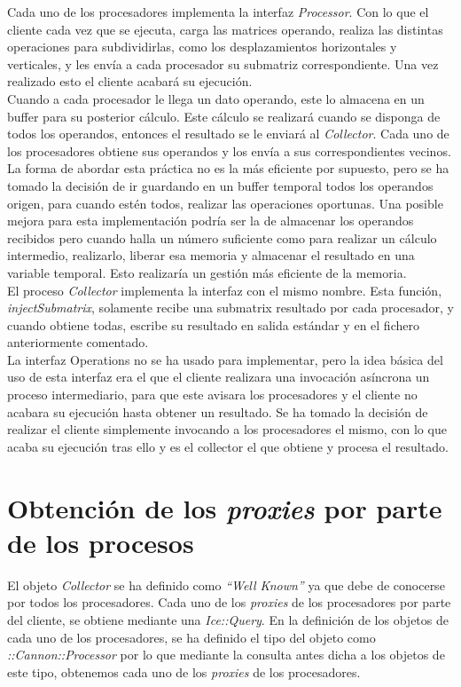 Cada uno de los procesadores implementa la interfaz \emph{ Processor}. Con lo que el cliente cada vez que se ejecuta, carga las matrices operando, realiza las distintas operaciones para subdividirlas, como los desplazamientos horizontales y verticales, y les envía a cada procesador su submatriz correspondiente. Una vez realizado esto el cliente acabará su ejecución. \\
Cuando a cada procesador le llega un dato operando, este lo almacena en un buffer para su posterior cálculo. Este cálculo se realizará cuando se disponga de todos los operandos, entonces el resultado se le enviará al \emph{Collector}. Cada uno de los procesadores obtiene sus operandos y los envía a sus correspondientes vecinos.\\ 
La forma de abordar esta práctica no es la más eficiente por supuesto, pero se ha tomado la decisión de ir guardando en un buffer temporal todos los operandos origen, para cuando estén todos, realizar las operaciones oportunas. Una posible mejora para esta implementación podría ser la de almacenar los operandos recibidos pero cuando halla un número suficiente como para realizar un cálculo intermedio, realizarlo, liberar esa memoria y almacenar el resultado en una variable temporal. Esto realizaría un gestión más eficiente de la memoria. 
\\
El proceso \emph{Collector} implementa la interfaz con el mismo nombre. Esta función, \emph{injectSubmatrix}, solamente recibe una submatrix resultado por cada procesador, y cuando obtiene todas, escribe su resultado en salida estándar y en el fichero anteriormente comentado.
\\
La interfaz Operations no se ha usado para implementar, pero la idea básica del uso de esta interfaz era el que el cliente realizara una invocación asíncrona un proceso intermediario, para que este avisara los procesadores y el cliente no acabara su ejecución hasta obtener un resultado. Se ha tomado la decisión de realizar el cliente simplemente invocando a los procesadores el mismo, con lo que acaba su ejecución tras ello y es el collector el que obtiene y procesa el resultado.



\section{Obtención de los \emph{proxies} por parte de los procesos}

El objeto \emph {Collector} se ha definido como \emph{``Well Known''} ya que debe de conocerse por todos los procesadores.
Cada uno de los \emph{proxies} de los procesadores por parte del cliente, se obtiene mediante una \emph{Ice::Query}. En la definición de los objetos de cada uno de los procesadores, se ha definido el tipo del objeto como \emph{::Cannon::Processor} por lo que mediante la consulta antes dicha a los objetos de este tipo, obtenemos cada uno de los \emph {proxies} de los procesadores.






